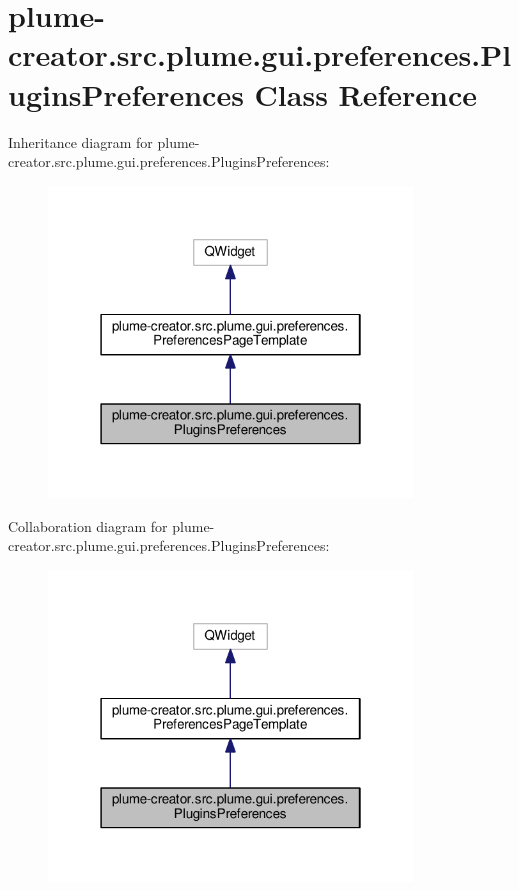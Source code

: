 \hypertarget{classplume-creator_1_1src_1_1plume_1_1gui_1_1preferences_1_1_plugins_preferences}{}\section{plume-\/creator.src.\+plume.\+gui.\+preferences.\+Plugins\+Preferences Class Reference}
\label{classplume-creator_1_1src_1_1plume_1_1gui_1_1preferences_1_1_plugins_preferences}


Inheritance diagram for plume-\/creator.src.\+plume.\+gui.\+preferences.\+Plugins\+Preferences\+:\nopagebreak
\begin{figure}[H]
\begin{center}
\leavevmode
\includegraphics[width=274pt]{classplume-creator_1_1src_1_1plume_1_1gui_1_1preferences_1_1_plugins_preferences__inherit__graph}
\end{center}
\end{figure}


Collaboration diagram for plume-\/creator.src.\+plume.\+gui.\+preferences.\+Plugins\+Preferences\+:\nopagebreak
\begin{figure}[H]
\begin{center}
\leavevmode
\includegraphics[width=274pt]{classplume-creator_1_1src_1_1plume_1_1gui_1_1preferences_1_1_plugins_preferences__coll__graph}
\end{center}
\end{figure}
